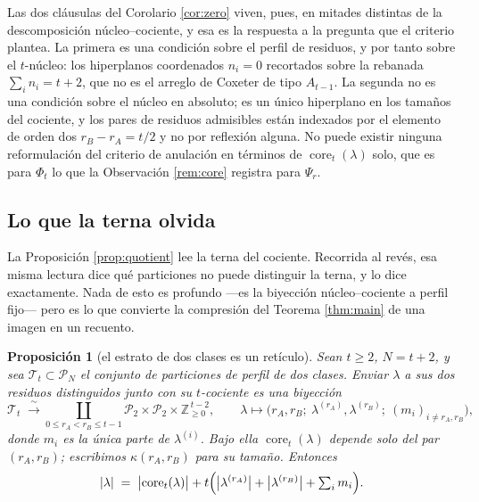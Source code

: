 \documentclass[11pt,reqno]{amsart}
\theoremstyle{plain}
\newtheorem{proposition}[theorem]{Proposición}
\theoremstyle{definition}
\newcommand{\ZZ}{\mathbb{Z}}
\newcommand{\PP}{\mathcal{P}}
\newcommand{\core}{\operatorname{core}}
\begin{document}
Las dos cláusulas del Corolario \ref{cor:zero} viven, pues, en mitades distintas de la
descomposición núcleo--cociente, y esa es la respuesta a la pregunta que el criterio plantea. La
primera es una condición sobre el perfil de residuos, y por tanto sobre el $t$-núcleo: los
hiperplanos coordenados $n_i=0$ recortados sobre la rebanada $\sum_i n_i=t+2$, que no es el arreglo
de Coxeter de tipo $A_{t-1}$. La segunda no es una condición sobre el núcleo en absoluto; es un
único hiperplano en los tamaños del cociente, y los pares de residuos admisibles están indexados por
el elemento de orden dos $r_B-r_A=t/2$ y no por reflexión alguna. No puede existir ninguna
reformulación del criterio de anulación en términos de $\core_t(\lambda)$ solo, que es para $\Phi_t$
lo que la Observación \ref{rem:core} registra para $\Psi_r$.

\subsection{Lo que la terna olvida}\label{sec:fibrelattice}
La Proposición \ref{prop:quotient} lee la terna del cociente. Recorrida al revés, esa misma
lectura dice qué particiones no puede distinguir la terna, y lo dice exactamente. Nada de esto es
profundo ---es la biyección núcleo--cociente a perfil fijo--- pero es lo que convierte la
compresión del Teorema \ref{thm:main} de una imagen en un recuento.

\begin{proposition}[el estrato de dos clases es un retículo]\label{prop:fibrelattice}
Sean $t\ge2$, $N=t+2$, y sea $\mathcal{T}_t\subset\PP_N$ el conjunto de particiones de perfil de dos
clases. Enviar $\lambda$ a sus dos residuos distinguidos junto con su $t$-cociente es una biyección
\begin{equation}\label{eq:fibrelattice}
\mathcal{T}_t\;\xrightarrow{\ \sim\ }\!\!\!\coprod_{0\le r_A<r_B\le t-1}\!\!\!
\PP_2\times\PP_2\times\ZZ_{\ge0}^{\,t-2},
\qquad
\lambda\longmapsto\bigl(r_A,r_B;\ \lambda^{(r_A)},\lambda^{(r_B)};\ (m_i)_{i\ne r_A,r_B}\bigr),
\end{equation}
donde $m_i$ es la única parte de $\lambda^{(i)}$. Bajo ella $\core_t(\lambda)$ depende solo del par
$(r_A,r_B)$; escribimos $\kappa(r_A,r_B)$ para su tamaño. Entonces
\begin{equation}\label{eq:sizelattice}
|\lambda|\;=\;\bigl|\core_t(\lambda)\bigr|
+t\Bigl(\bigl|\lambda^{(r_A)}\bigr|+\bigl|\lambda^{(r_B)}\bigr|+\textstyle\sum_i m_i\Bigr).
\end{equation}
\end{proposition}
\end{document}
